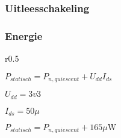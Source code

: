 \begin{frame}
    \frametitle{Uitleesschakeling}
    


\end{frame}

\begin{frame}
    \frametitle{Energie}

    \begin{wrapfigure}{r}{0.5\textwidth}
        \centering
        \def\svgwidth{0.5\textwidth}
        
    \end{wrapfigure}
    
    $P_{statisch} = P_{n,quiescent} + U_{dd}I_{ds}$
    \pause
    \vspace{1cm}

    $U_{dd}=3v3$

    $I_{ds}=50\mu$
    \pause

    $P_{statisch} = P_{n,quiescent} + 165\mu\mathrm{W}$
\end{frame}